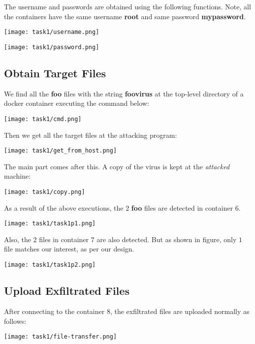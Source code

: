 \documentclass{article}
\begin{document}
The username and passwords are obtained using the following functions. Note, all the containers have the same username \textbf{root} and same password \textbf{mypassword}.
\begin{center}
    \texttt{[image: task1/username.png]}
\end{center}
\begin{center}
    \texttt{[image: task1/password.png]}
\end{center}


\subsection{Obtain Target Files}
We find all the \textbf{foo} files with the string \textbf{foovirus} at the top-level directory of a docker container executing the command below:
\begin{center}
    \texttt{[image: task1/cmd.png]}
\end{center}

Then we get all the target files at the attacking program:
\begin{center}
    \texttt{[image: task1/get\_from\_host.png]}
\end{center}

The main part comes after this. A copy of the virus is kept at the \textit{attacked} machine:
\begin{center}
    \texttt{[image: task1/copy.png]}
\end{center}

As a result of the above executions, the $2$ \textbf{foo} files are detected in container $6$.
\begin{center}
    \texttt{[image: task1/task1p1.png]}
\end{center}

Also, the $2$ files in container $7$ are also detected. But as shown in figure, only $1$ file matches our interest, as per our design.
\begin{center}
    \texttt{[image: task1/task1p2.png]}
\end{center}


\subsection{Upload Exfiltrated Files}
After connecting to the container $8$, the exfiltrated files are uploaded normally as follows: 
\begin{center}
    \texttt{[image: task1/file-transfer.png]}
\end{center}
\end{document}
